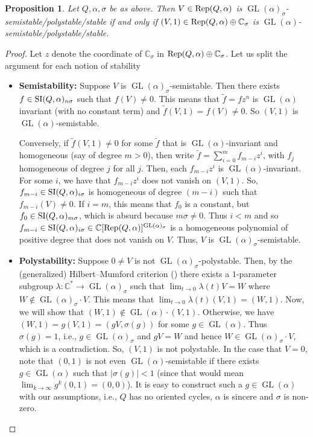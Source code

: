 \documentclass[11pt]{amsart}
\newtheorem{proposition}[theorem]{Proposition}
\theoremstyle{definition}
\newcommand{\Rep}{{\rm Rep}}
\newcommand{\SI}{{\rm SI}}
\newcommand{\C}{{\mathbb C}}
\newcommand{\GL}{\operatorname{GL}}
\begin{document}
\begin{proposition}
Let $Q,\alpha,\sigma$ be as above. Then $V \in \Rep(Q,\alpha)$ is $\GL(\alpha)_\sigma$-semistable/polystable/stable if and only if $(V,1) \in \Rep(Q,\alpha) \oplus \C_\sigma$ is $\GL(\alpha)$-semistable/polystable/stable.
\end{proposition}

\begin{proof}
Let $z$ denote the coordinate of $\C_\sigma$ in $\Rep(Q,\alpha) \oplus \C_\sigma$. Let us split the argument for each notion of stability
\begin{itemize}
\item {\bf Semistability:} Suppose $V$ is $\GL(\alpha)_\sigma$-semistable. Then there exists $f \in \SI(Q,\alpha)_{n\sigma}$ such that $f(V) \neq 0$. This means that $\widetilde{f} = f z^n$ is $\GL(\alpha)$ invariant (with no constant term) and $\widetilde{f}(V,1) = f(V) \neq 0$. So $(V,1)$ is $\GL(\alpha)$-semistable.

Conversely, if $\widetilde{f}(V,1) \neq 0$ for some $\widetilde{f}$ that is $\GL(\alpha)$-invariant and homogeneous (say of degree $m > 0$), then write $\widetilde{f} = \sum_{i = 0}^m f_{m-i} z^{i}$, with $f_j$ homogeneous of degree $j$ for all $j$. Then, each $f_{m-i} z^{i}$ is $\GL(\alpha)$-invariant. For some $i$, we have that $f_{m-i} z^{i}$ does not vanish on $(V,1)$. So, $f_{m-i} \in \SI(Q,\alpha)_{i\sigma}$ is homogeneous of degree $(m-i)$ such that $f_{m-i}(V) \neq 0$. %
If $i = m$, this means that $f_0$ is a constant, but $f_0 \in \SI(Q,\alpha)_{m\sigma}$, which is absurd because $m\sigma \neq 0$. Thus $i < m$ and so $f_{m-i} \in \SI(Q,\alpha)_{i \sigma} \in \C[\Rep(Q,\alpha)]^{\GL(\alpha)_\sigma}$ is a homogeneous polynomial of positive degree that does not vanish on $V$. Thus, $V$ is $\GL(\alpha)_\sigma$-semistable. 

\item {\bf Polystability:} Suppose $0 \neq V$ is not $\GL(\alpha)_\sigma$-polystable. Then, by the (generalized) Hilbert--Mumford criterion (\cite[Proposition~9.6.2]{DW-book}) there exists a $1$-parameter subgroup $\lambda:\C^* \rightarrow \GL(\alpha)_\sigma$ such that $\lim_{t \to 0} \lambda(t) V = W$ where $W \notin \GL(\alpha)_\sigma \cdot V$. This means that $\lim_{t \to 0} \lambda(t) (V,1) = (W,1)$. Now, we will show that $(W,1) \notin \GL(\alpha) \cdot (V,1)$. Otherwise, we have $(W,1) = g (V,1) = (gV, \sigma(g))$ for some $g \in \GL(\alpha)$. Thus $\sigma(g) = 1$, i.e., $g \in \GL(\alpha)_\sigma$ and $gV = W$ and hence $W \in \GL(\alpha)_\sigma \cdot V$, which is a contradiction. So, $(V,1)$ is not polystable. In the case that $V = 0$, note that $(0,1)$ is not even $\GL(\alpha)$-semistable if there exists $g \in \GL(\alpha)
$ such that $|\sigma(g)| < 1$ (since that would mean $\lim_{k \to \infty} g^k (0,1) = (0,0)$). It is easy to construct such a $g \in \GL(\alpha)$ with our assumptions, i.e., $Q$ has no oriented cycles, $\alpha$ is sincere and $\sigma$ is non-zero.


\end{itemize}
\end{proof}
\end{document}
